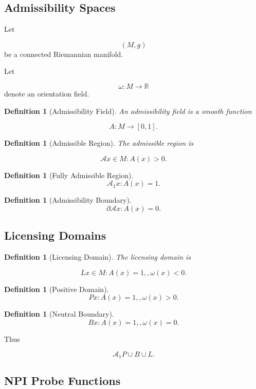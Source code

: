 \documentclass[12pt]{article}
\newtheorem{definition}[theorem]{Definition}
\theoremstyle{remark}
\begin{document}
\subsection{Admissibility Spaces}

Let

\[
(M,g)
\]
be a connected Riemannian manifold.

Let

\[
\omega:M\rightarrow\mathbb R
\]
denote an orientation field.

\begin{definition}[Admissibility Field]
An admissibility field is a smooth function

\[
A:M\rightarrow[0,1].
\]
\end{definition}
\begin{definition}[Admissible Region]
The admissible region is

\[
\mathcal A
{x\in M:A(x)>0}.
\]
\end{definition}

\begin{definition}[Fully Admissible Region]
\[
\mathcal A_1
{x:A(x)=1}.
\]
\end{definition}

\begin{definition}[Admissibility Boundary]
\[
\partial\mathcal A
{x:A(x)=0}.
\]
\end{definition}

\subsection{Licensing Domains}

\begin{definition}[Licensing Domain]
The licensing domain is

\[
L
{
x\in M:
A(x)=1,
,
\omega(x)<0
}.
\]
\end{definition}

\begin{definition}[Positive Domain]
\[
P
{
x:
A(x)=1,
,
\omega(x)>0
}.
\]
\end{definition}

\begin{definition}[Neutral Boundary]
\[
B
{
x:
A(x)=1,
,
\omega(x)=0
}.
\]
\end{definition}

Thus

\[
\mathcal A_1
P\cup B\cup L.
\]

\subsection{NPI Probe Functions}
\end{document}
